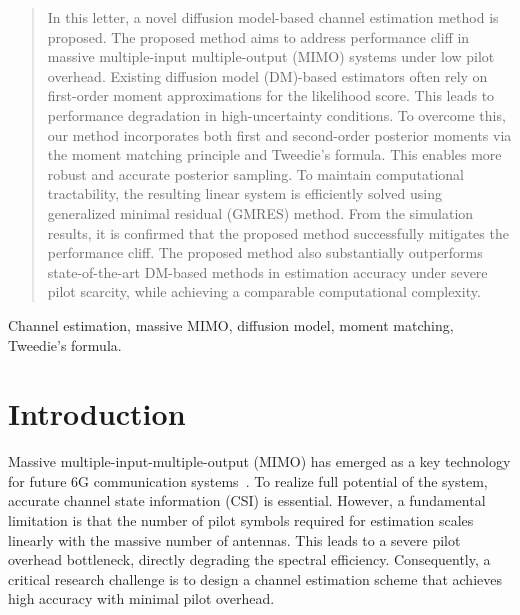 \documentclass[lettersize,journal]{IEEEtran}
\begin{document}
\maketitle
\begin{abstract}
In this letter, a novel diffusion model-based channel estimation method is proposed. The proposed method aims to address performance cliff in massive multiple-input multiple-output (MIMO) systems under low pilot overhead. Existing diffusion model (DM)-based estimators often rely on first-order moment approximations for the likelihood score. This leads to performance degradation in high-uncertainty conditions. To overcome this, our method incorporates both first and second-order posterior moments via the moment matching principle and Tweedie's formula. This enables more robust and accurate posterior sampling. To maintain computational tractability, the resulting linear system is efficiently solved using generalized minimal residual (GMRES) method. From the simulation results, it is confirmed that the proposed method successfully mitigates the performance cliff. The proposed method also substantially outperforms state-of-the-art DM-based methods in estimation accuracy under severe pilot scarcity, while achieving a comparable computational complexity.
\end{abstract}

\begin{IEEEkeywords}
Channel estimation, massive MIMO, diffusion model, moment matching, Tweedie's formula.
\end{IEEEkeywords}


\section{Introduction}

Massive multiple-input-multiple-output (MIMO) has emerged as a key technology for future 6G communication systems~\cite{busariMillimeterWaveMassiveMIMO2018}. To realize full potential of the system, accurate channel state information (CSI) is essential. However, a fundamental limitation is that the number of pilot symbols required for estimation scales linearly with the massive number of antennas. This leads to a severe pilot overhead bottleneck, directly degrading the spectral efficiency. Consequently, a critical research challenge is to design a channel estimation scheme that achieves high accuracy with minimal pilot overhead.
\end{document}
